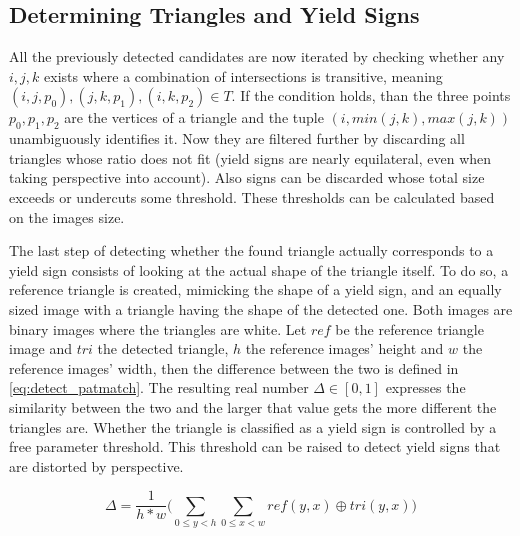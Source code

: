 \documentclass{report}
\begin{document}
\subsection{Determining Triangles and Yield Signs}

All the previously detected candidates are now iterated by checking
whether any \( i, j, k \) exists where a combination of intersections
is transitive, meaning \( (i, j, p_0), (j, k, p_1), (i, k, p_2) \in T
\). If the condition holds, than the three points \( p_0, p_1, p_2 \)
are the vertices of a triangle and the tuple \( (i, min(j,k),
max(j,k)) \) unambiguously identifies it. Now they are filtered
further by discarding all triangles whose ratio does not fit (yield
signs are nearly equilateral, even when taking perspective into
account). Also signs can be discarded whose total size exceeds or
undercuts some threshold. These thresholds can be calculated based on
the images size.

The last step of detecting whether the found triangle actually
corresponds to a yield sign consists of looking at the actual shape of
the triangle itself. To do so, a reference triangle is created,
mimicking the shape of a yield sign, and an equally sized image with a
triangle having the shape of the detected one. Both images are binary
images where the triangles are white. Let \( ref \) be the reference
triangle image and \( tri \) the detected triangle, \( h \) the
reference images' height and \( w \) the reference images' width, then
the difference between the two is defined in
\ref{eq:detect_patmatch}. The resulting real number \( \Delta \in [0,
  1] \) expresses the similarity between the two and the larger that
value gets the more different the triangles are. Whether the triangle
is classified as a yield sign is controlled by a free parameter
threshold. This threshold can be raised to detect yield signs that are
distorted by perspective.

\begin{equation}\label{eq:detect_patmatch}
  \Delta = \frac{1}{h * w} \Bigg( \sum_{0 \leq y < h}\sum_{0 \leq x <w} ref(y, x) \oplus tri(y, x) \Bigg)
\end{equation}
\end{document}
